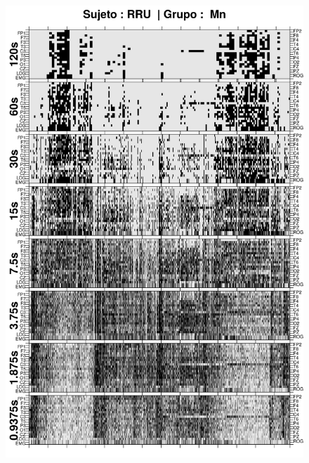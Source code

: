 \begin{figure}
\centering
\includegraphics[width=0.9\linewidth]
{./img_ejemplos/RRMNS_comp_est_.png} 
\end{figure}


